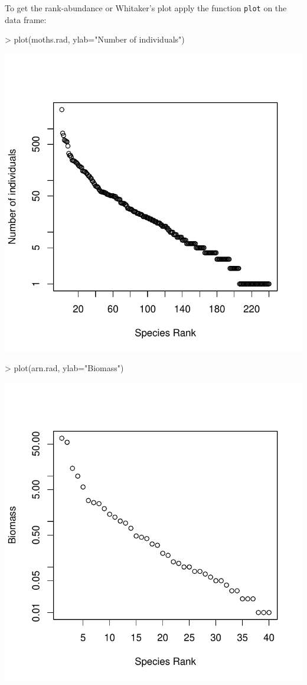 \documentclass[11pt, A4]{article}
\newcommand{\code}[1]{\texttt{#1}}
\begin{document}
To get the rank-abundance or Whitaker's plot apply the function \code{plot} on the data frame:


\begin{Schunk}
\begin{Sinput}
> plot(moths.rad, ylab="Number of individuals")
\end{Sinput}
\end{Schunk}
\includegraphics{sads_quick_reference-radplot1}


\begin{Schunk}
\begin{Sinput}
> plot(arn.rad, ylab="Biomass")
\end{Sinput}
\end{Schunk}
\includegraphics{sads_quick_reference-radplots}
\end{document}
